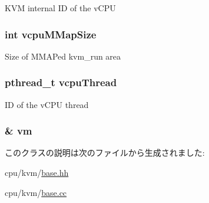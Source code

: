 \label{classBaseKvmCPU_ac52bdf6886dcfd53068633de9ed83184}
KVM internal ID of the vCPU \hypertarget{classBaseKvmCPU_a0915679bdc25b2c015f15996f6d4ff6d}{
\subsubsection[{vcpuMMapSize}]{\setlength{\rightskip}{0pt plus 5cm}int {\bf vcpuMMapSize}}}
\label{classBaseKvmCPU_a0915679bdc25b2c015f15996f6d4ff6d}
Size of MMAPed kvm\_\-run area \hypertarget{classBaseKvmCPU_a8a181f878f7db2579a3a67dd2d8c5902}{
\subsubsection[{vcpuThread}]{\setlength{\rightskip}{0pt plus 5cm}pthread\_\-t {\bf vcpuThread}}}
\label{classBaseKvmCPU_a8a181f878f7db2579a3a67dd2d8c5902}
ID of the vCPU thread \hypertarget{classBaseKvmCPU_a6b8ecd9ec419f0cbe3c1047be643fe08}{
\subsubsection[{vm}]{\& {\bf vm}}}
\label{classBaseKvmCPU_a6b8ecd9ec419f0cbe3c1047be643fe08}


このクラスの説明は次のファイルから生成されました:\begin{DoxyCompactItemize}
\item 
cpu/kvm/\hyperlink{cpu_2kvm_2base_8hh}{base.hh}\item 
cpu/kvm/\hyperlink{cpu_2kvm_2base_8cc}{base.cc}\end{DoxyCompactItemize}
